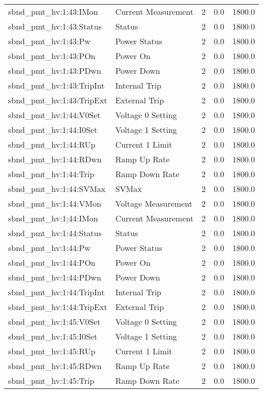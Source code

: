 \begin{center}
\begin{longtable}{l | l l l l }
sbnd\_pmt\_hv:1:43:IMon & Current Measurement & 2 & 0.0 & 1800.0\\ 
sbnd\_pmt\_hv:1:43:Status & Status & 2 & 0.0 & 1800.0\\ 
sbnd\_pmt\_hv:1:43:Pw & Power Status & 2 & 0.0 & 1800.0\\ 
sbnd\_pmt\_hv:1:43:POn & Power On & 2 & 0.0 & 1800.0\\ 
sbnd\_pmt\_hv:1:43:PDwn & Power Down & 2 & 0.0 & 1800.0\\ 
sbnd\_pmt\_hv:1:43:TripInt & Internal Trip & 2 & 0.0 & 1800.0\\ 
sbnd\_pmt\_hv:1:43:TripExt & External Trip & 2 & 0.0 & 1800.0\\ 
sbnd\_pmt\_hv:1:44:V0Set & Voltage 0 Setting & 2 & 0.0 & 1800.0\\ 
sbnd\_pmt\_hv:1:44:I0Set & Voltage 1 Setting & 2 & 0.0 & 1800.0\\ 
sbnd\_pmt\_hv:1:44:RUp & Current 1 Limit & 2 & 0.0 & 1800.0\\ 
sbnd\_pmt\_hv:1:44:RDwn & Ramp Up Rate & 2 & 0.0 & 1800.0\\ 
sbnd\_pmt\_hv:1:44:Trip & Ramp Down Rate & 2 & 0.0 & 1800.0\\ 
sbnd\_pmt\_hv:1:44:SVMax & SVMax & 2 & 0.0 & 1800.0\\ 
sbnd\_pmt\_hv:1:44:VMon & Voltage Measurement & 2 & 0.0 & 1800.0\\ 
sbnd\_pmt\_hv:1:44:IMon & Current Measurement & 2 & 0.0 & 1800.0\\ 
sbnd\_pmt\_hv:1:44:Status & Status & 2 & 0.0 & 1800.0\\ 
sbnd\_pmt\_hv:1:44:Pw & Power Status & 2 & 0.0 & 1800.0\\ 
sbnd\_pmt\_hv:1:44:POn & Power On & 2 & 0.0 & 1800.0\\ 
sbnd\_pmt\_hv:1:44:PDwn & Power Down & 2 & 0.0 & 1800.0\\ 
sbnd\_pmt\_hv:1:44:TripInt & Internal Trip & 2 & 0.0 & 1800.0\\ 
sbnd\_pmt\_hv:1:44:TripExt & External Trip & 2 & 0.0 & 1800.0\\ 
sbnd\_pmt\_hv:1:45:V0Set & Voltage 0 Setting & 2 & 0.0 & 1800.0\\ 
sbnd\_pmt\_hv:1:45:I0Set & Voltage 1 Setting & 2 & 0.0 & 1800.0\\ 
sbnd\_pmt\_hv:1:45:RUp & Current 1 Limit & 2 & 0.0 & 1800.0\\ 
sbnd\_pmt\_hv:1:45:RDwn & Ramp Up Rate & 2 & 0.0 & 1800.0\\ 
sbnd\_pmt\_hv:1:45:Trip & Ramp Down Rate & 2 & 0.0 & 1800.0\\ 

\end{longtable}
\end{center}
